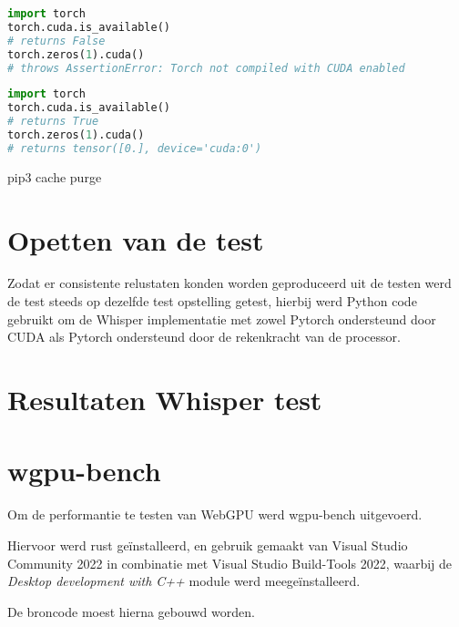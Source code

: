 \begin{lstlisting}[language=python]
import torch
torch.cuda.is_available()
# returns False
torch.zeros(1).cuda()
# throws AssertionError: Torch not compiled with CUDA enabled
\end{lstlisting}


\begin{lstlisting}[language=python]
import torch
torch.cuda.is_available()
# returns True
torch.zeros(1).cuda()
# returns tensor([0.], device='cuda:0')
\end{lstlisting}





pip3 cache purge

\section*{Opetten van de test}

Zodat er consistente relustaten konden worden geproduceerd uit de testen werd de test steeds op dezelfde test opstelling getest, hierbij werd Python code gebruikt om de Whisper implementatie met zowel Pytorch ondersteund door CUDA als Pytorch ondersteund door de rekenkracht van de processor.

\section*{Resultaten Whisper test}

\section{wgpu-bench}

Om de performantie te testen van WebGPU werd wgpu-bench uitgevoerd.

Hiervoor werd rust geïnstalleerd, en gebruik gemaakt van Visual Studio Community 2022 in combinatie met Visual Studio Build-Tools 2022, waarbij de \textit{Desktop development with C++} module werd meegeïnstalleerd.

De broncode moest hierna gebouwd worden.


\break{}
